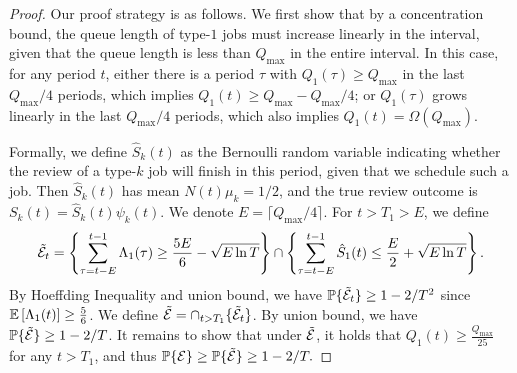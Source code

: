 \begin{proof}
Our proof strategy is as follows. We first show that by a concentration bound, the queue length of type-$1$ jobs must increase linearly in the interval, given that the queue length is less than $Q_{\max}$ in the entire interval. In this case, for any period $t$, either there is a period $\tau$ with $Q_1(\tau) \geq Q_{\max}$ in the last $Q_{\max}/4$ periods, which implies $Q_1(t) \geq Q_{\max}-Q_{\max}/4$; or $Q_1(\tau)$ grows linearly in the last $Q_{\max}/4$ periods, which also implies $Q_1(t) = \Omega(Q_{\max}).$

Formally, we define $\hat{S}_k(t)$ as the Bernoulli random variable indicating whether the review of a type-$k$ job will finish in this period, given that we schedule such a job. Then $\hat{S}_k(t)$ has mean $N(t)\mu_k=1/2$, and the true review outcome is $S_k(t) = \hat{S}_k(t)\psi_k(t)$. 
We denote $E = \lceil Q_{\max} / 4\rceil$. For $t > T_1 > E$, we define 
\[
\tilde{\mathcal{E}}_t = \left\{\sum_{\tau= t - E}^{t-1} \Lambda_1(\tau) \geq \frac{5E}{6} - \sqrt{E\ln T}\right\} \cap \left\{\sum_{\tau= t - E}^{t-1} \hat{S}_1(t) \leq \frac{E}{2} + \sqrt{E\ln T}\right\}.
\]
By Hoeffding Inequality and union bound, we have $\mathbb{P}\{\tilde{\mathcal{E}}_t\} \geq 1 - 2/T^2$ since $\mathbb E\left[\Lambda_1(t)\right] \geq \frac{5}{6}$. We define $\tilde{\mathcal{E}} = \cap_{t > T_1}\{\tilde{\mathcal{E}}_t\}$. By union bound, we have $\mathbb{P}\{\tilde{\mathcal{E}}\} \geq 1 - 2/T$. It remains to show that under $\tilde{\mathcal{E}}$, it holds that $Q_1(t) \geq \frac{Q_{\max}}{25}$ for any $t > T_1$, and thus $\mathbb{P}\{\mathcal{E}\} \geq \mathbb{P}\{\tilde{\mathcal{E}}\} \geq 1 - 2/T.$


\end{proof}
